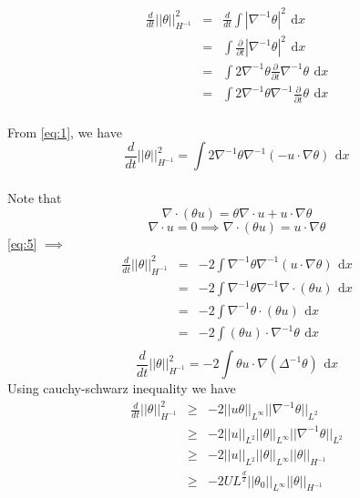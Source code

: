 \documentclass[12pt]{report}   %
\renewcommand{\geq}{\geqslant}
\numberwithin{equation}{section}
\theoremstyle{plain}
\theoremstyle{definition}
\theoremstyle{remark}
\newcommand{\rmd}{\, \mathrm{d}}
\begin{document}
\begin{eqnarray*}   
\frac{d}{dt}||\theta||_{H^{-1}}^2  & = & \frac{d}{dt}\int |\nabla^{-1}\theta|^2 ~\rmd x \\
& = & \int \frac{\partial}{\partial t} |\nabla^{-1}\theta|^2 ~\rmd x \\
& =  & \int  2 \nabla^{-1}\theta \frac{\partial}{\partial t} \nabla^{-1}\theta ~\rmd x  \\
& = &  \int  2 \nabla^{-1}\theta  \nabla^{-1}\frac{\partial}{\partial t}\theta ~\rmd x  \\
\end{eqnarray*}

From \eqref{eq:1}, we have
\begin{equation}
\frac{d}{dt}||\theta||_{H^{-1}}^2 =  \int  2 \nabla^{-1}\theta  \nabla^{-1} (-u\cdot\nabla\theta)  ~\rmd x \label{eq:5}
\end{equation} \\
Note that 
\[\nabla\cdot(\theta u) = \theta \nabla\cdot u + u \cdot \nabla\theta \]
\[\nabla\cdot u = 0 \implies \nabla\cdot(\theta u)  =   u \cdot \nabla\theta \] 
\eqref{eq:5} $\implies$
\begin{eqnarray*}   
 \frac{d}{dt}||\theta||_{H^{-1}}^2 &= & -2 \int  \nabla^{-1}\theta  \nabla^{-1} (u\cdot\nabla\theta)  ~\rmd x \\
& = & -2 \int  \nabla^{-1}\theta  \nabla^{-1}  \nabla\cdot(\theta u)  ~\rmd x \\
& =  & -2 \int  \nabla^{-1}\theta \cdot(\theta u)  ~\rmd x\\
&= & -2 \int (\theta u) \cdot \nabla^{-1}\theta  ~\rmd x \\
\end{eqnarray*}
\begin{equation}
 \frac{d}{dt}||\theta||_{H^{-1}}^2 =  -2 \int \theta u \cdot \nabla(\Delta^{-1}\theta)  ~\rmd x \label{eq:6}
\end{equation}
Using cauchy-schwarz inequality we have 
\begin{eqnarray*}   
 \frac{d}{dt}||\theta||_{H^{-1}}^2 & \geq &-2 || u\theta||_{L^\infty}||\nabla^{-1}\theta||_{L^2}  \\
 &  \geq & -2 ||u||_{L^2} || \theta||_{L^\infty}||\nabla^{-1}\theta||_{L^2}  \\
 & \geq &-2 || u||_{L^2} ||\theta||_{L^\infty}  ||\theta||_{H^{-1}} \\
 & \geq & -2UL^{\frac{d}{2}} || \theta_0||_{L^\infty} ||\theta||_{H^{-1}}  \\
\end{eqnarray*}
\end{document}
